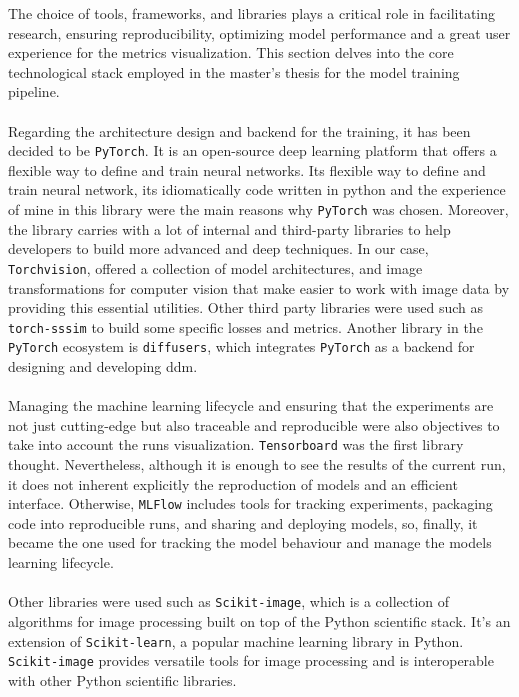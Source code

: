 The choice of tools, frameworks, and libraries plays a critical role in facilitating research, ensuring reproducibility, optimizing model performance and a great user experience for the metrics visualization. This section delves into the core technological stack employed in the master's thesis for the model training pipeline. \cite{cloud-removal-tfm}
\\
\\
Regarding the architecture design and backend for the training, it has been decided to be \texttt{PyTorch}. It is an open-source deep learning platform that offers a flexible way to define and train neural networks. Its flexible way to define and train neural network, its idiomatically code written in python and the experience of mine in this library were the main reasons why \texttt{PyTorch} was chosen. Moreover, the library carries with a lot of internal and third-party libraries to help developers to build more advanced and deep techniques. In our case, \texttt{Torchvision}, offered a collection of model architectures, and image transformations for computer vision that make easier to work with image data by providing this essential utilities. Other third party libraries were used such as \texttt{torch-sssim} to build some specific losses and metrics. Another library in the \texttt{PyTorch} ecosystem is \texttt{diffusers}, which integrates \texttt{PyTorch} as a backend for designing and developing \gls{ddm}.
\\
\\
Managing the machine learning lifecycle and ensuring that the experiments are not just cutting-edge but also traceable and reproducible were also objectives to take into account the runs visualization. \texttt{Tensorboard} was the first library thought. Nevertheless, although it is enough to see the results of the current run, it does not inherent explicitly the reproduction of models and an efficient interface. Otherwise, \texttt{MLFlow} includes tools for tracking experiments, packaging code into reproducible runs, and sharing and deploying models, so, finally, it became the one used for tracking the model behaviour and manage the models learning lifecycle.
\\
\\
Other libraries were used such as \texttt{Scikit-image}, which is a collection of algorithms for image processing built on top of the Python scientific stack. It's an extension of \texttt{Scikit-learn}, a popular machine learning library in Python. \texttt{Scikit-image} provides versatile tools for image processing and is interoperable with other Python scientific libraries.
